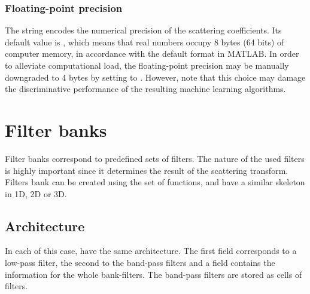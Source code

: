 \documentclass{article}
\begin{document}
\subsubsection{Floating-point precision}
The string  encodes the numerical precision of the scattering coefficients. Its default value is , which means that real numbers occupy 8 bytes (64 bits) of computer memory, in accordance with the default format in MATLAB. In order to alleviate computational load, the floating-point precision may be manually downgraded to 4 bytes by setting  to . However, note that this choice may damage the discriminative performance of the resulting machine learning algorithms.

\section{Filter banks \label{sec:filters}}
Filter banks correspond to predefined sets of filters. The nature of the used filters is highly important since it determines the result of the scattering transform. Filters bank can be created using the  set of functions, and have a similar skeleton in 1D, 2D or 3D.

\subsection{Architecture \label{sub:filters-architecture}}
% 
%        
%             
%             
 
 In each of this case,  have the same architecture. The first field corresponds to a low-pass filter, the second to the band-pass filters and a field  contains the information for the whole bank-filters.
 The band-pass filters are stored as cells of filters.
\end{document}
